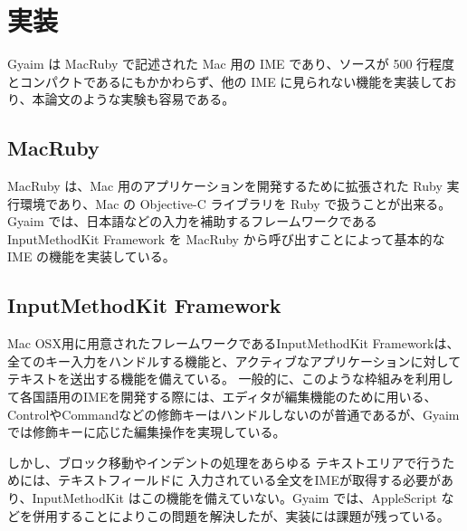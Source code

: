 \section{実装}
Gyaim は MacRuby で記述された Mac 用の IME であり、ソースが 500 行程度とコンパクトであるにもかかわらず、他の IME に見られない機能を実装しており、本論文のような実験も容易である。

\subsection{MacRuby}
MacRuby は、Mac 用のアプリケーションを開発するために拡張された Ruby 実行環境であり、Mac の Objective-C ライブラリを Ruby で扱うことが出来る。
Gyaim では、日本語などの入力を補助するフレームワークである InputMethodKit Framework を MacRuby から呼び出すことによって基本的な IME の機能を実装している。

\subsection{InputMethodKit Framework}
Mac OSX用に用意されたフレームワークであるInputMethodKit Frameworkは、全てのキー入力をハンドルする機能と、アクティブなアプリケーションに対してテキストを送出する機能を備えている。
一般的に、このような枠組みを利用して各国語用のIMEを開発する際には、エディタが編集機能のために用いる、ControlやCommandなどの修飾キーはハンドルしないのが普通であるが、Gyaimでは修飾キーに応じた編集操作を実現している。

しかし、ブロック移動やインデントの処理をあらゆる テキストエリアで行うためには、テキストフィールドに 入力されている全文をIMEが取得する必要があり、InputMethodKit はこの機能を備えていない。Gyaim では、AppleScript などを併用することによりこの問題を解決したが、実装には課題が残っている。